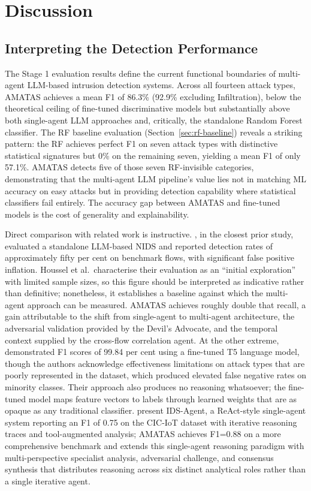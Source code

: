 \documentclass[../main.tex]{subfiles}
\begin{document}
\chapter{Discussion}
\label{ch:discussion}

\section{Interpreting the Detection Performance}

The Stage 1 evaluation results define the current functional boundaries of multi-agent LLM-based intrusion detection systems. Across all fourteen attack types, AMATAS achieves a mean F1 of 86.3\% (92.9\% excluding Infiltration), below the theoretical ceiling of fine-tuned discriminative models but substantially above both single-agent LLM approaches and, critically, the standalone Random Forest classifier. The RF baseline evaluation (Section~\ref{sec:rf-baseline}) reveals a striking pattern: the RF achieves perfect F1 on seven attack types with distinctive statistical signatures but 0\% on the remaining seven, yielding a mean F1 of only 57.1\%. AMATAS detects five of those seven RF-invisible categories, demonstrating that the multi-agent LLM pipeline's value lies not in matching ML accuracy on easy attacks but in providing detection capability where statistical classifiers fail entirely. The accuracy gap between AMATAS and fine-tuned models is the cost of generality and explainability.

Direct comparison with related work is instructive. \textcite{Houssel2024}, in the closest prior study, evaluated a standalone LLM-based NIDS and reported detection rates of approximately fifty per cent on benchmark flows, with significant false positive inflation. Houssel et al.\ characterise their evaluation as an ``initial exploration'' with limited sample sizes, so this figure should be interpreted as indicative rather than definitive; nonetheless, it establishes a baseline against which the multi-agent approach can be measured. AMATAS achieves roughly double that recall, a gain attributable to the shift from single-agent to multi-agent architecture, the adversarial validation provided by the Devil's Advocate, and the temporal context supplied by the cross-flow correlation agent. At the other extreme, \textcite{GutierrezGaleano2025} demonstrated F1 scores of 99.84 per cent using a fine-tuned T5 language model, though the authors acknowledge effectiveness limitations on attack types that are poorly represented in the dataset, which produced elevated false negative rates on minority classes. Their approach also produces no reasoning whatsoever; the fine-tuned model maps feature vectors to labels through learned weights that are as opaque as any traditional classifier. \textcite{Li2024} present IDS-Agent, a ReAct-style single-agent system reporting an F1 of 0.75 on the CIC-IoT dataset with iterative reasoning traces and tool-augmented analysis; AMATAS achieves F1=0.88 on a more comprehensive benchmark and extends this single-agent reasoning paradigm with multi-perspective specialist analysis, adversarial challenge, and consensus synthesis that distributes reasoning across six distinct analytical roles rather than a single iterative agent.
\end{document}
